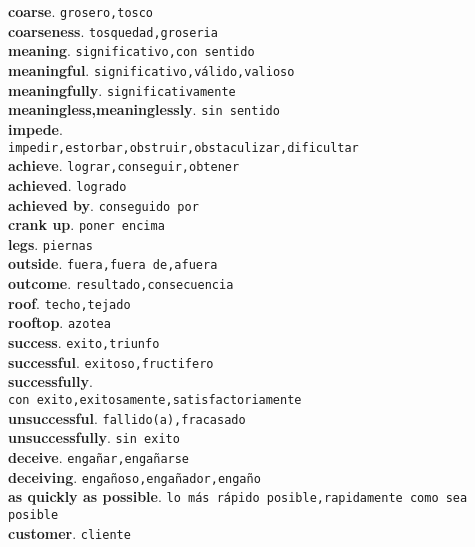 \documentclass[twocolumn]{article}
\begin{document}
	\textsf{\textbf{coarse}}. \texttt{grosero,tosco}\\
	\textsf{\textbf{coarseness}}. \texttt{tosquedad,groseria}\\
	\textsf{\textbf{meaning}}. \texttt{significativo,con sentido}\\
	\textsf{\textbf{meaningful}}. \texttt{significativo,v\'alido,valioso}\\
	\textsf{\textbf{meaningfully}}. \texttt{significativamente}\\
	\textsf{\textbf{meaningless,meaninglessly}}. \texttt{sin sentido}\\
	\textsf{\textbf{impede}}.\\ \texttt{impedir,estorbar,obstruir,obstaculizar,dificultar}\\
	\textsf{\textbf{achieve}}. \texttt{lograr,conseguir,obtener}\\
	\textsf{\textbf{achieved}}. \texttt{logrado}\\
	\textsf{\textbf{achieved by}}. \texttt{conseguido por}\\
	\textsf{\textbf{crank up}}. \texttt{poner encima}\\
	\textsf{\textbf{legs}}. \texttt{piernas}\\
	\textsf{\textbf{outside}}. \texttt{fuera,fuera de,afuera}\\
	\textsf{\textbf{outcome}}. \texttt{resultado,consecuencia}\\
	\textsf{\textbf{roof}}. \texttt{techo,tejado}\\
	\textsf{\textbf{rooftop}}. \texttt{azotea}\\
	\textsf{\textbf{success}}. \texttt{exito,triunfo}\\
	\textsf{\textbf{successful}}. \texttt{exitoso,fructifero}\\
	\textsf{\textbf{successfully}}.\\ \texttt{con exito,exitosamente,satisfactoriamente}\\
    \textsf{\textbf{unsuccessful}}. \texttt{fallido(a),fracasado}\\
	\textsf{\textbf{unsuccessfully}}. \texttt{sin exito}\\
	\textsf{\textbf{deceive}}. \texttt{enga\~nar,enga\~narse}\\
	\textsf{\textbf{deceiving}}. \texttt{enga\~noso,enga\~nador,enga\~no}\\
	\textsf{\textbf{as quickly as possible}}. \texttt{lo m\'as r\'apido posible,rapidamente como sea posible}\\
	\textsf{\textbf{customer}}. \texttt{cliente}\\
\end{document}
